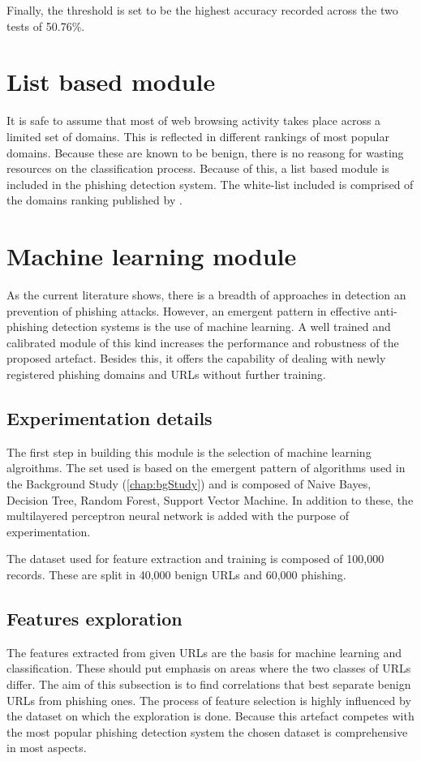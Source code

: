 Finally, the threshold is set to be the highest accuracy recorded across the two tests of 50.76\%.

\section{List based module}
It is safe to assume that most of web browsing activity takes place across a limited set of domains. This is reflected in different rankings of most popular domains. Because these are known to be benign, there is no reasong for wasting resources on the classification process. Because of this, a list based module is included in the phishing detection system.
The white-list included is comprised of the domains ranking published by \cite{MAJESTIC_MILLION}.

\section{Machine learning module}
As the current literature shows, there is a breadth of approaches in detection an prevention of phishing attacks. However, an emergent pattern in effective anti-phishing detection systems is the use of machine learning. A well trained and calibrated module of this kind increases the performance and robustness of the proposed artefact. Besides this, it offers the capability of dealing with newly registered phishing domains and URLs without further training.

\subsection{Experimentation details}
The first step in building this module is the selection of machine learning algroithms. The set used is based on the emergent pattern of algorithms used in the Background Study (\ref{chap:bgStudy}) and is composed of Naive Bayes, Decision Tree, Random Forest, Support Vector Machine. In addition to these, the multilayered perceptron neural network is added with the purpose of experimentation.

The dataset used for feature extraction and training is composed of 100,000 records. These are split in 40,000 benign URLs and 60,000 phishing.

\subsection{Features exploration}
The features extracted from given URLs are the basis for machine learning and classification. These should put emphasis on areas where the two classes of URLs differ. The aim of this subsection is to find correlations that best separate benign URLs from phishing ones. The process of feature selection is highly influenced by the dataset on which the exploration is done. Because this artefact competes with the most popular phishing detection system the chosen dataset is comprehensive in most aspects.

